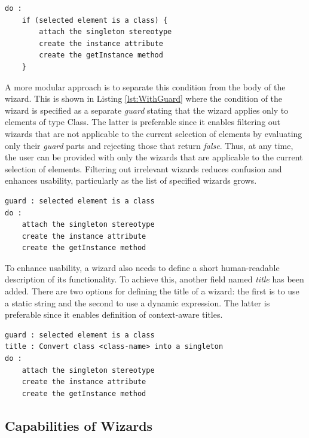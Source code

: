 \begin{lstlisting}[caption=The wizard of Listing \ref{lst:Basic} enhanced with an $if$ condition, label=lst:WithoutGuard, language=EWL]
do : 
	if (selected element is a class) {
		attach the singleton stereotype
		create the instance attribute
		create the getInstance method
	}
\end{lstlisting}

A more modular approach is to separate this condition from the body of the wizard. This is shown in Listing \ref{lst:WithGuard} where the condition of the wizard is specified as a separate \emph{guard} stating that the wizard applies only to elements of type Class. The latter is preferable since it enables filtering out wizards that are not applicable to the current selection of elements by evaluating only their \emph{guard} parts and rejecting those that return \emph{false}. Thus, at any time, the user can be provided with only the wizards that are applicable to the current selection of elements. Filtering out irrelevant wizards reduces confusion and enhances usability, particularly as the list of specified wizards grows.

\begin{lstlisting}[caption=The wizard of Listing \ref{lst:WithoutGuard} with an explicit $guard$ instead of the $if$ condition, label=lst:WithGuard, language=EWL]
guard : selected element is a class
do : 
	attach the singleton stereotype
	create the instance attribute
	create the getInstance method
\end{lstlisting}

To enhance usability, a wizard also needs to define a short human-readable description of its functionality. To achieve this, another field named \emph{title} has been added. There are two options for defining the title of a wizard: the first is to use a static string and the second to use a dynamic expression. The latter is preferable since it enables definition of context-aware titles.

\begin{lstlisting}[caption=The wizard of Listing \ref{lst:WithGuard} enhanced with a $title$ part, label=lst:FinalForm, language=EWL]
guard : selected element is a class
title : Convert class <class-name> into a singleton
do : 
	attach the singleton stereotype
	create the instance attribute
	create the getInstance method
\end{lstlisting}

\subsection{Capabilities of Wizards}

